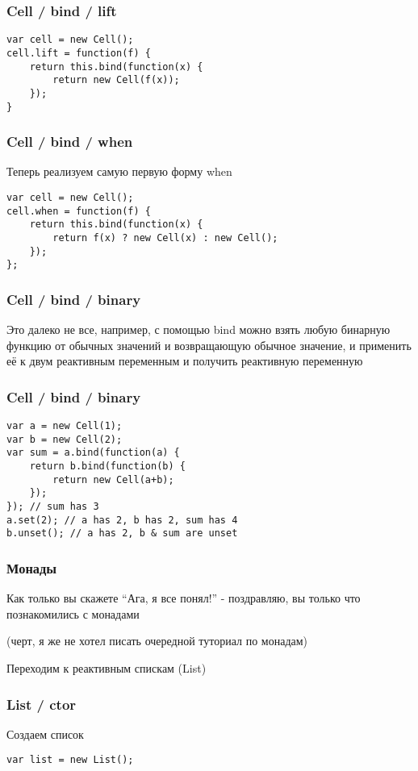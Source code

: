 \documentclass[xetex]{beamer}
\begin{document}
\begin{frame}[fragile]
\frametitle{Cell / bind / lift}
\begin{lstlisting}
var cell = new Cell();
cell.lift = function(f) {
    return this.bind(function(x) {
        return new Cell(f(x));
    });
}
\end{lstlisting}
\end{frame}


\begin{frame}[fragile]
\frametitle{Cell / bind / when}
Теперь реализуем самую первую форму when
\vspace{10mm}
\begin{lstlisting}
var cell = new Cell();
cell.when = function(f) {
    return this.bind(function(x) {
        return f(x) ? new Cell(x) : new Cell();
    });
};
\end{lstlisting}
\end{frame}


\begin{frame}[fragile]
\frametitle{Cell / bind / binary}
Это далеко не все, например, с помощью bind можно взять любую бинарную функцию от обычных значений и возвращающую обычное значение, и применить её к двум реактивным переменным и получить реактивную переменную
\end{frame}


\begin{frame}[fragile]
\frametitle{Cell / bind / binary}
\begin{lstlisting}
var a = new Cell(1);
var b = new Cell(2);
var sum = a.bind(function(a) {
    return b.bind(function(b) {
        return new Cell(a+b);
    });
}); // sum has 3
a.set(2); // a has 2, b has 2, sum has 4
b.unset(); // a has 2, b & sum are unset
\end{lstlisting}
\end{frame}


\begin{frame}[fragile]
\frametitle{Монады}
Как только вы скажете ``Ага, я все понял!'' - поздравляю, вы только что познакомились с монадами

\vspace{10mm}
{\color{comments-color}(черт, я же не хотел писать очередной туториал по монадам)}
\end{frame}


\begin{frame}
    Переходим к реактивным спискам (List)
\end{frame}

\lstset{
  xleftmargin=.2\textwidth, xrightmargin=.2\textwidth
}
\begin{frame}[fragile]
\frametitle{List / ctor}
Создаем список

\vspace{10mm}
\begin{lstlisting}
var list = new List();
\end{lstlisting}
\end{frame}
\end{document}
